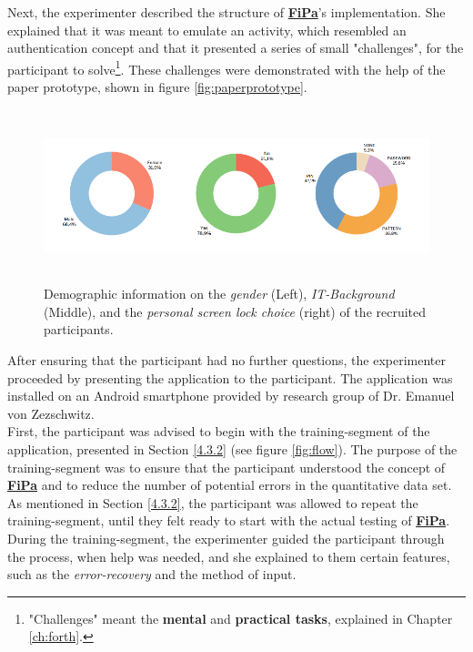 Next, the experimenter described the structure of \underline{\textbf{FiPa}}'s implementation. She explained that it was meant to emulate an activity, which resembled an authentication concept and that it presented a series of small "challenges", for the participant to solve\footnote{"Challenges" meant the \textbf{mental} and \textbf{practical tasks}, explained in Chapter \ref{ch:forth}.}. These challenges were demonstrated with the help of the paper prototype, shown in figure \ref{fig:paperprototype}.\\

\begin{figure}[t!]
\centering
\includegraphics[width=15cm, height=5cm]{Chapters/graphics/Demos.PNG}
\caption{Demographic information on the \textit{gender} (Left), \textit{IT-Background} (Middle), and the \textit{personal screen lock choice} (right) of the recruited participants.}
\label{fig:demo}
\end{figure}

After ensuring that the participant had no further questions, the experimenter proceeded by presenting the application to the participant. The application was installed on an Android smartphone provided by research group of Dr. Emanuel von Zezschwitz.\\
First, the participant was advised to begin with the training-segment of the application, presented in Section \ref{4.3.2} (see figure \ref{fig:flow}). The purpose of the training-segment was to ensure that the participant understood the concept of \underline{\textbf{FiPa}} and to reduce the number of potential errors in the quantitative data set. As mentioned in Section \ref{4.3.2}, the participant was allowed to repeat the training-segment, until they felt ready to start with the actual testing of \underline{\textbf{FiPa}}. During the training-segment, the experimenter guided the participant through the process, when help was needed, and she explained to them certain features, such as the \textit{error-recovery} and the method of input. \\

